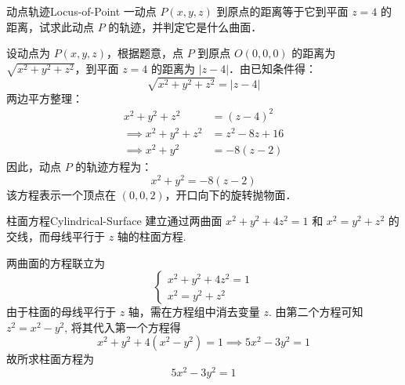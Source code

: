 \begin{problem}{动点轨迹}{Locus-of-Point}
    一动点 $P(x, y, z)$ 到原点的距离等于它到平面 $z = 4$ 的距离，试求此动点 $P$ 的轨迹，并判定它是什么曲面．
\end{problem}

\begin{solution}
    设动点为 $P(x, y, z)$，根据题意，点 $P$ 到原点 $O(0, 0, 0)$ 的距离为 $\sqrt{x^2 + y^2 + z^2}$，到平面 $z = 4$ 的距离为 $|z - 4|$．由已知条件得：
    \begin{equation}
        \sqrt{x^2 + y^2 + z^2} = |z - 4|
    \end{equation}
    两边平方整理：
    \begin{equation}
        \begin{aligned}
            x^2 + y^2 + z^2          & = (z - 4)^2     \\
            \implies x^2 + y^2 + z^2 & = z^2 - 8z + 16 \\
            \implies x^2 + y^2       & = -8(z - 2)
        \end{aligned}
    \end{equation}
    因此，动点 $P$ 的轨迹方程为：
    \begin{equation}
        \boxed{x^2 + y^2 = -8(z - 2)}
    \end{equation}
    该方程表示一个顶点在 $(0, 0, 2)$，开口向下的旋转抛物面．
\end{solution}


\begin{problem}{柱面方程}{Cylindrical-Surface}
    建立通过两曲面 $x^2 + y^2 + 4z^2 = 1$ 和 $x^2 = y^2 + z^2$ 的交线，而母线平行于 $z$ 轴的柱面方程.
\end{problem}

\begin{solution}
    两曲面的方程联立为
    \begin{equation}
        \begin{cases}
            x^2 + y^2 + 4z^2 = 1 \\
            x^2 = y^2 + z^2
        \end{cases}
    \end{equation}
    由于柱面的母线平行于 $z$ 轴，需在方程组中消去变量 $z$. 由第二个方程可知 $z^2 = x^2 - y^2$, 将其代入第一个方程得
    \begin{equation}
        x^2 + y^2 + 4(x^2 - y^2) = 1 \implies 5x^2 - 3y^2 = 1
    \end{equation}
    故所求柱面方程为
    \begin{equation}
        \boxed{5x^2 - 3y^2 = 1}
    \end{equation}
\end{solution}


